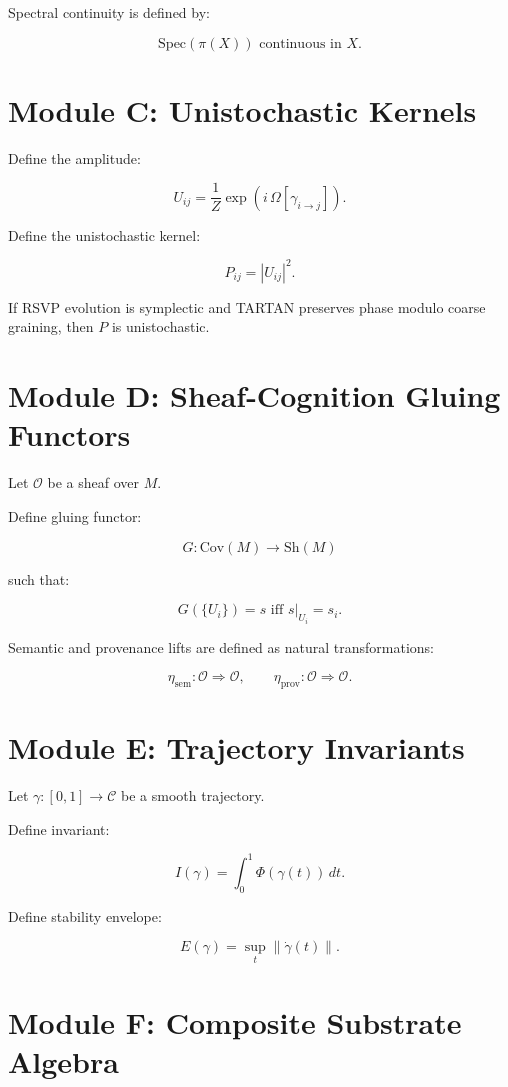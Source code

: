 Spectral continuity is defined by:

\[
\mathrm{Spec}(\pi(X)) \text{ continuous in } X.
\]

\section{Module C: Unistochastic Kernels}

Define the amplitude:

\[
U_{ij} = \frac{1}{Z} \exp(i\,\Omega[\gamma_{i\to j}]).
\]

Define the unistochastic kernel:

\[
P_{ij} = |U_{ij}|^2.
\]

\begin{theorem}
If RSVP evolution is symplectic and TARTAN preserves phase modulo coarse
graining, then $P$ is unistochastic.
\end{theorem}

\section{Module D: Sheaf-Cognition Gluing Functors}

Let $\mathcal{O}$ be a sheaf over $M$.

Define gluing functor:

\[
G : \mathrm{Cov}(M) \to \mathrm{Sh}(M)
\]

such that:

\[
G(\{U_i\}) = s \text{ iff } s|_{U_i} = s_i.
\]

Semantic and provenance lifts are defined as natural transformations:

\[
\eta_{\mathrm{sem}} : \mathcal{O} \Rightarrow \mathcal{O}, \qquad
\eta_{\mathrm{prov}} : \mathcal{O} \Rightarrow \mathcal{O}.
\]

\section{Module E: Trajectory Invariants}

Let $\gamma : [0,1] \to \mathcal{C}$ be a smooth trajectory.

Define invariant:

\[
I(\gamma) = \int_0^1 \Phi(\gamma(t))\, dt.
\]

Define stability envelope:

\[
E(\gamma) = \sup_{t} \|\dot{\gamma}(t)\|.
\]

\section{Module F: Composite Substrate Algebra}

